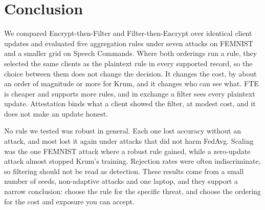 \section{Conclusion}
\label{sec:conclusion}

We compared Encrypt-then-Filter and Filter-then-Encrypt over identical client updates and evaluated five aggregation rules under seven attacks on FEMNIST and a smaller grid on Speech Commands. Where both orderings run a rule, they selected the same clients as the plaintext rule in every supported record, so the choice between them does not change the decision. It changes the cost, by about an order of magnitude or more for Krum, and it changes who can see what. FTE is cheaper and supports more rules, and in exchange a filter sees every plaintext update. Attestation binds what a client showed the filter, at modest cost, and it does not make an update honest.

No rule we tested was robust in general. Each one lost accuracy without an attack, and most lost it again under attacks that did not harm FedAvg. Scaling was the one FEMNIST attack where a robust rule gained, while a zero-update attack almost stopped Krum's training. Rejection rates were often indiscriminate, so filtering should not be read as detection. These results come from a small number of seeds, non-adaptive attacks and one laptop, and they support a narrow conclusion: choose the rule for the specific threat, and choose the ordering for the cost and exposure you can accept.
